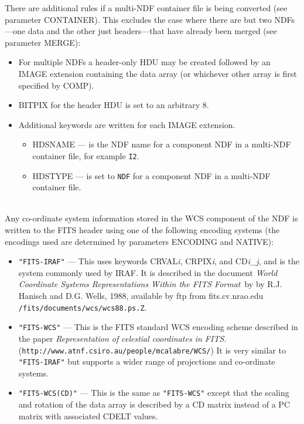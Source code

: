 \documentclass[twoside,11pt]{article}
\newcommand{\htmladdnormallink}[2]{#1}
\newcommand{\latex}[1]{#1}
\newcommand{\sstdiytopic}[2]{\goodbreak \item[{\hspace{-0.35em}#1\hspace{-0.35em}:}] \mbox{} \\[1.3ex] #2}
\newcommand{\ssthitemlist}[1]{
  \latexonly{
  \mbox{} \\
  \vspace{-3.5ex}
  }
  \begin{itemize}
     #1
  \end{itemize}
}
\newcommand{\sstitem}{\item}
\newcommand{\sstdiytopic}[2]{\\ \item[{#1}:]
      \begin{description}
         #2
      \end{description}
   }
\newcommand{\sstitem}{\item}
\begin{document}
{{{      }
      There are additional rules if a multi-NDF container file is being
      converted (see parameter CONTAINER).  This excludes the case where
      there are but two NDFs---one data and the other just 
      headers---that have already been merged (see parameter MERGE):
      \ssthitemlist{

         \sstitem
            For multiple NDFs a header-only HDU may be created followed 
            by an IMAGE extension containing the data array (or 
            whichever other array is first specified by COMP).
         \sstitem
            BITPIX for the header HDU is set to an arbitrary 8.
         \sstitem
            Additional keywords are written for each IMAGE extension.
         \ssthitemlist{
            \sstitem
             HDSNAME --- is the NDF name for a component NDF in a multi-NDF
               container file, for example \texttt{I2}.
             \sstitem
             HDSTYPE --- is set to \texttt{NDF} for a component NDF in a 
               multi-NDF container file.
         }
      }      
   }
   \sstdiytopic{
      \label{world_coordinate_systems}World Co-ordinate Systems
   }{
      Any co-ordinate system information stored in the WCS component of the
      NDF is written to the FITS header using one of the following encoding
      systems (the encodings used are determined by parameters ENCODING and 
      NATIVE):
      \ssthitemlist{

         \sstitem 
         \texttt{"FITS-IRAF"} --- This uses keywords CRVAL\textit{i},
         CRPIX\textit{i}, and CD\textit{i\_j}, and is the
         system commonly used by IRAF. It is described in the document
         \textit{World Coordinate Systems Representations Within the FITS
         Format}\ by by R.J. Hanisch and D.G. Wells, 1988, available by ftp from
         fits.cv.nrao.edu \texttt{/fits/documents/wcs/wcs88.ps.Z}.


         \sstitem
         \texttt{"FITS-WCS"} --- This is the FITS standard WCS encoding 
         scheme described in the paper 
         \htmladdnormallink{\textit{Representation of celestial coordinates in FITS.}}
         {http://www.atnf.csiro.au/people/mcalabre/WCS/}\\ \latex{
         (\texttt{http://www.atnf.csiro.au/people/mcalabre/WCS/})}  It is
         very similar to \texttt{"FITS-IRAF"} but supports a wider range of
         projections and co-ordinate systems.

         \sstitem
         \texttt{"FITS-WCS(CD)"} --- This is the same as \texttt{"FITS-WCS"}
         except that the scaling and rotation of the data array is described by a 
         CD matrix instead of a PC matrix with associated CDELT values.

}}}
\end{document}
